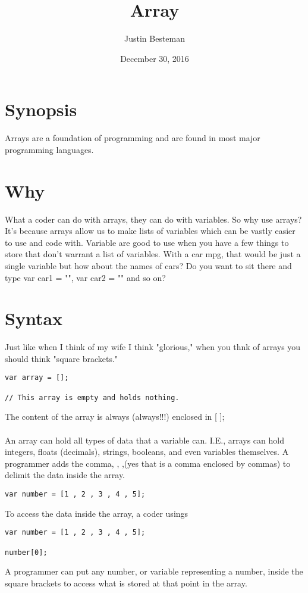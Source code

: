 \documentclass[12pt, letterpaper]{article}
\title{Array}
\author{Justin Besteman}
\date{December 30, 2016}
\begin{document}
\maketitle


\section*{Synopsis}

Arrays are a foundation of programming and are found in most major programming languages.

\section*{Why}

What a coder can do with arrays, they can do with variables. So why use arrays? It's because arrays allow us to make lists of variables which can be vastly easier to use and code with. Variable are good to use when you have a few things to store that don't warrant a list of variables. With a car mpg, that would be just a single variable but how about the names of cars? Do you want to sit there and type var car1 = "", var car2 = "" and so on? \\


\section*{Syntax}

Just like when I think of my wife I think "glorious," when you thnk of arrays you should think "square brackets."
\begin{lstlisting}
var array = [];

// This array is empty and holds nothing. 
\end{lstlisting}
The content of the array is always (always!!!) enclosed in [ ];\\ \\
An array can hold all types of data that a variable can. I.E., arrays can hold integers, floats (decimals), strings, booleans, and even variables themselves. A programmer adds the comma, , ,(yes that is a comma enclosed by commas) to delimit the data inside the array.\\
\begin{lstlisting}
var number = [1 , 2 , 3 , 4 , 5];
\end{lstlisting}
To access the data inside the array, a coder usings 
\begin{lstlisting}
var number = [1 , 2 , 3 , 4 , 5];

number[0];
\end{lstlisting}
A programmer can put any number, or variable representing a number, inside the square brackets to access what is stored at that point in the array. 
\end{document}

